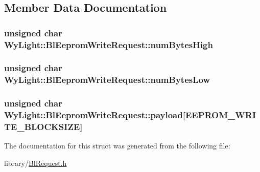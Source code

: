\subsection{Member Data Documentation}
\hypertarget{struct_wy_light_1_1_bl_eeprom_write_request_a241263672f5229fea259fa45e8cafae0}{
\subsubsection[{num\-Bytes\-High}]{\setlength{\rightskip}{0pt plus 5cm}unsigned char Wy\-Light\-::\-Bl\-Eeprom\-Write\-Request\-::num\-Bytes\-High}}\label{struct_wy_light_1_1_bl_eeprom_write_request_a241263672f5229fea259fa45e8cafae0}
\hypertarget{struct_wy_light_1_1_bl_eeprom_write_request_a70fa73997362e6e765c9f2bdfaf67aef}{
\subsubsection[{num\-Bytes\-Low}]{\setlength{\rightskip}{0pt plus 5cm}unsigned char Wy\-Light\-::\-Bl\-Eeprom\-Write\-Request\-::num\-Bytes\-Low}}\label{struct_wy_light_1_1_bl_eeprom_write_request_a70fa73997362e6e765c9f2bdfaf67aef}
\hypertarget{struct_wy_light_1_1_bl_eeprom_write_request_ae5efc27e17509d1ba2655f964f7a2917}{
\subsubsection[{payload}]{\setlength{\rightskip}{0pt plus 5cm}unsigned char Wy\-Light\-::\-Bl\-Eeprom\-Write\-Request\-::payload\mbox{[}{\bf E\-E\-P\-R\-O\-M\-\_\-\-W\-R\-I\-T\-E\-\_\-\-B\-L\-O\-C\-K\-S\-I\-Z\-E}\mbox{]}}}\label{struct_wy_light_1_1_bl_eeprom_write_request_ae5efc27e17509d1ba2655f964f7a2917}


The documentation for this struct was generated from the following file\-:\begin{DoxyCompactItemize}
\item 
library/\hyperlink{_bl_request_8h}{Bl\-Request.\-h}\end{DoxyCompactItemize}
